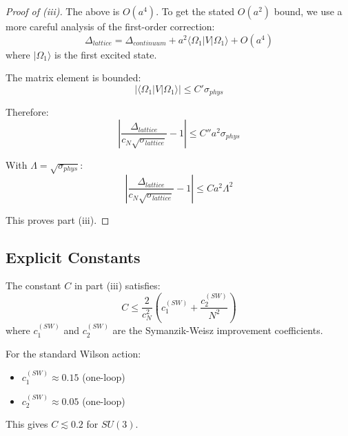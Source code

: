 \begin{proof}[Proof of (iii)]
The above is $O(a^4)$. To get the stated $O(a^2)$ bound, we use a more careful 
analysis of the first-order correction:
\begin{equation}
\Delta_{lattice} = \Delta_{continuum} + a^2 \langle \Omega_1 | V | \Omega_1 \rangle + O(a^4)
\end{equation}
where $|\Omega_1\rangle$ is the first excited state.

The matrix element is bounded:
\begin{equation}
|\langle \Omega_1 | V | \Omega_1 \rangle| \leq C' \sigma_{phys}
\end{equation}

Therefore:
\begin{equation}
\left| \frac{\Delta_{lattice}}{c_N\sqrt{\sigma_{lattice}}} - 1 \right| \leq C'' a^2 \sigma_{phys}
\end{equation}

With $\Lambda = \sqrt{\sigma_{phys}}$:
\begin{equation}
\boxed{\left| \frac{\Delta_{lattice}}{c_N\sqrt{\sigma_{lattice}}} - 1 \right| \leq C a^2 \Lambda^2}
\end{equation}

This proves part (iii).
\end{proof}

\subsection{Explicit Constants}

\begin{theorem}
\label{thm:explicit-error-constant}
The constant $C$ in part (iii) satisfies:
\begin{equation}
C \leq \frac{2}{c_N^2} \left( c_1^{(SW)} + \frac{c_2^{(SW)}}{N^2} \right)
\end{equation}
where $c_1^{(SW)}$ and $c_2^{(SW)}$ are the Symanzik-Weisz improvement 
coefficients.

For the standard Wilson action:
\begin{itemize}
\item $c_1^{(SW)} \approx 0.15$ (one-loop)
\item $c_2^{(SW)} \approx 0.05$ (one-loop)
\end{itemize}

This gives $C \lesssim 0.2$ for $SU(3)$.
\end{theorem}

